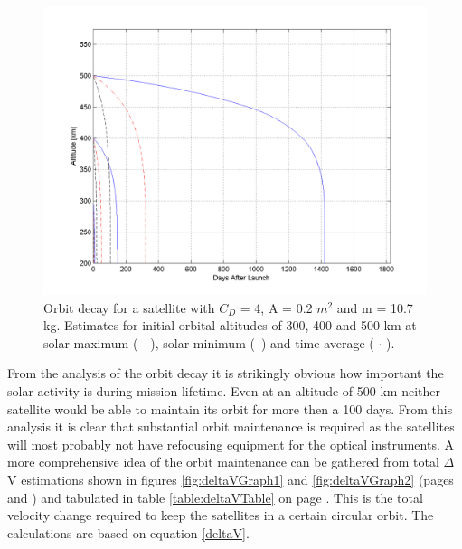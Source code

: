 \begin{figure}[h!]
\centering
\includegraphics[width=0.95\textheight, angle=90]{chapters/img/orbitDecayRecieverMin.png}
\caption{Orbit decay for a satellite with $C_D$ = 4, A = 0.2 $m^2$ and m = 10.7 kg. Estimates for initial orbital altitudes of 300, 400 and 500 km at solar maximum (- -), solar minimum (--) and time average (-$\cdot$-).}
\label{fig:decayReceiver}
\end{figure}

From the analysis of the orbit decay it is strikingly obvious how important the solar activity is during mission lifetime. Even at an altitude of 500 km neither satellite would be able to maintain its orbit for more then a 100 days. From this analysis it is clear that substantial orbit maintenance is required as the satellites will most probably not have refocusing equipment for the optical instruments. A more comprehensive idea of the orbit maintenance can be gathered from total $\Delta$V estimations shown in figures \ref{fig:deltaVGraph1} and \ref{fig:deltaVGraph2} (pages \pageref{fig:deltaVGraph1} and \pageref{fig:deltaVGraph2}) and tabulated in table \ref{table:deltaVTable} on page \pageref{table:deltaVTable}. This is the total velocity change required to keep the satellites in a certain circular orbit. The calculations are based on equation \ref{deltaV}.

